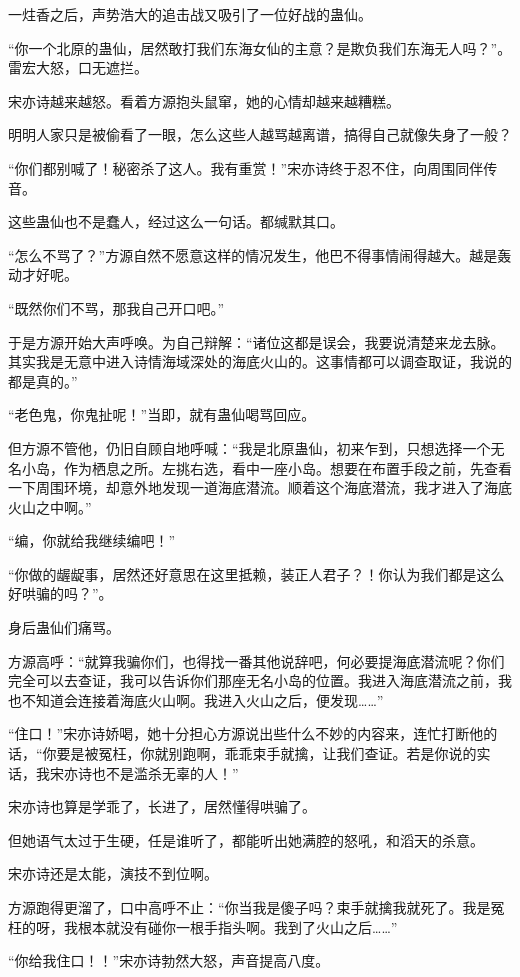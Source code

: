 \begin{this_body}
一炷香之后，声势浩大的追击战又吸引了一位好战的蛊仙。

“你一个北原的蛊仙，居然敢打我们东海女仙的主意？是欺负我们东海无人吗？”。雷宏大怒，口无遮拦。

宋亦诗越来越怒。看着方源抱头鼠窜，她的心情却越来越糟糕。

明明人家只是被偷看了一眼，怎么这些人越骂越离谱，搞得自己就像失身了一般？

“你们都别喊了！秘密杀了这人。我有重赏！”宋亦诗终于忍不住，向周围同伴传音。

这些蛊仙也不是蠢人，经过这么一句话。都缄默其口。

“怎么不骂了？”方源自然不愿意这样的情况发生，他巴不得事情闹得越大。越是轰动才好呢。

“既然你们不骂，那我自己开口吧。”

于是方源开始大声呼唤。为自己辩解：“诸位这都是误会，我要说清楚来龙去脉。其实我是无意中进入诗情海域深处的海底火山的。这事情都可以调查取证，我说的都是真的。”

“老色鬼，你鬼扯呢！”当即，就有蛊仙喝骂回应。

但方源不管他，仍旧自顾自地呼喊：“我是北原蛊仙，初来乍到，只想选择一个无名小岛，作为栖息之所。左挑右选，看中一座小岛。想要在布置手段之前，先查看一下周围环境，却意外地发现一道海底潜流。顺着这个海底潜流，我才进入了海底火山之中啊。”

“编，你就给我继续编吧！”

“你做的龌龊事，居然还好意思在这里抵赖，装正人君子？！你认为我们都是这么好哄骗的吗？”。

身后蛊仙们痛骂。

方源高呼：“就算我骗你们，也得找一番其他说辞吧，何必要提海底潜流呢？你们完全可以去查证，我可以告诉你们那座无名小岛的位置。我进入海底潜流之前，我也不知道会连接着海底火山啊。我进入火山之后，便发现……”

“住口！”宋亦诗娇喝，她十分担心方源说出些什么不妙的内容来，连忙打断他的话，“你要是被冤枉，你就别跑啊，乖乖束手就擒，让我们查证。若是你说的实话，我宋亦诗也不是滥杀无辜的人！”

宋亦诗也算是学乖了，长进了，居然懂得哄骗了。

但她语气太过于生硬，任是谁听了，都能听出她满腔的怒吼，和滔天的杀意。

宋亦诗还是太能，演技不到位啊。

方源跑得更溜了，口中高呼不止：“你当我是傻子吗？束手就擒我就死了。我是冤枉的呀，我根本就没有碰你一根手指头啊。我到了火山之后……”

“你给我住口！！”宋亦诗勃然大怒，声音提高八度。


\end{this_body}
